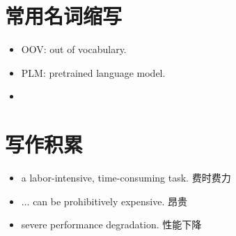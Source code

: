 \documentclass{article}
\begin{document}
\section{常用名词缩写}
\begin{itemize}
    \item OOV: out of vocabulary.
    \item PLM: pretrained language model.
    \item 
\end{itemize}

\section{写作积累}
\begin{itemize}
    \item a labor-intensive, time-consuming task.   费时费力
    \item ... can be prohibitively expensive.   昂贵
    \item severe performance degradation.   性能下降
\end{itemize}
\end{document}
